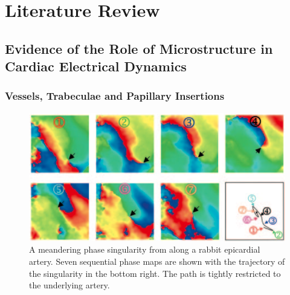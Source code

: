 \chapter{Literature Review}
\dblspace
\begin{quote}{\em }\end{quote}

\section{Evidence of the Role of Microstructure in Cardiac Electrical Dynamics} %
\label{sec:microstructure_has_profound_macroscopic_effects_on_propagation_dynamics}
  
  \subsection{Vessels, Trabeculae and Papillary Insertions} %
  \label{sub:vessels_trabeculae_and_papillary_insertions}
    \begin{figure}[htbp]
  		\centering
  		\includegraphics[width=1\textwidth]{Ch4/Figs/valderrabano}
      \caption{A meandering phase singularity from \cite{Valderrabano2003} along a rabbit epicardial artery. Seven sequential phase maps are shown with the trajectory of the  singularity in the bottom right. The path is tightly restricted to the underlying artery.}
  		\label{fig:meandering}
  	\end{figure}
    
